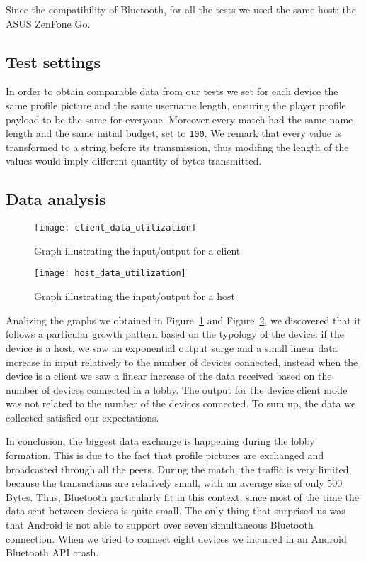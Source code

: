 Since the compatibility of Bluetooth, for all the tests we used the same host: 
the ASUS ZenFone Go.

\subsection{Test settings}

In order to obtain comparable data from our tests we set for each device 
the same profile picture and the same username length, ensuring the player 
profile payload to be the same for everyone. Moreover every match had the same 
name length and the same initial budget, set to \texttt{100}. We remark 
that every value is transformed to a string before its transmission, thus
modifing the length of the values would imply different quantity of bytes 
transmitted.

\subsection{Data analysis}
\begin{figure}[t]
 \centering
 \texttt{[image: client\_data\_utilization]}
 \caption{Graph illustrating the input/output for a client}
 \label{fig:res:cdu}
\end{figure}

\begin{figure}[t]
 \centering
 \texttt{[image: host\_data\_utilization]}
 \caption{Graph illustrating the input/output for a host}
 \label{fig:res:hdu}
\end{figure}

Analizing the graphs we obtained in Figure~\ref{fig:res:cdu} and 
Figure~\ref{fig:res:hdu}, we discovered that it follows a particular growth 
pattern based on the typology of the device: if the device is a host, we saw an 
exponential output surge and a small linear data increase in input relatively 
to the number of devices connected, instead when the device is a client we saw a 
linear increase of the data received based on the number of devices connected in 
a lobby. The output for the device client mode was not related to the number of 
the devices connected. To sum up, the data we collected satisfied our 
expectations.

In conclusion, the biggest data exchange is happening during the lobby 
formation. This is due to the fact that profile pictures are exchanged and 
broadcasted through all the peers. During the match, the traffic is very 
limited, because the transactions are relatively small, with an average size of 
only 500 Bytes. Thus, Bluetooth particularly fit in this context, since most of 
the time the data sent between devices is quite small.
The only thing that surprised us was that Android is not able to support over 
seven simultaneous Bluetooth connection. When we tried to connect eight devices 
we incurred in an Android Bluetooth API crash.
